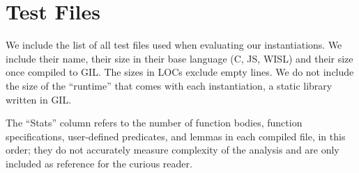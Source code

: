 \chapter{Test Files} \label{ap:test-files}

We include the list of all test files used when evaluating our instantiations. We include their name, their size in their base language (C, JS, WISL) and their size once compiled to GIL. The sizes in LOCs exclude empty lines. We do not include the size of the ``runtime'' that comes with each instantiation, a static library written in GIL.

The ``Stats'' column refers to the number of function bodies, function specifications, user-defined predicates, and lemmas in each compiled file, in this order; they do not accurately measure complexity of the analysis and are only included as reference for the curious reader.

